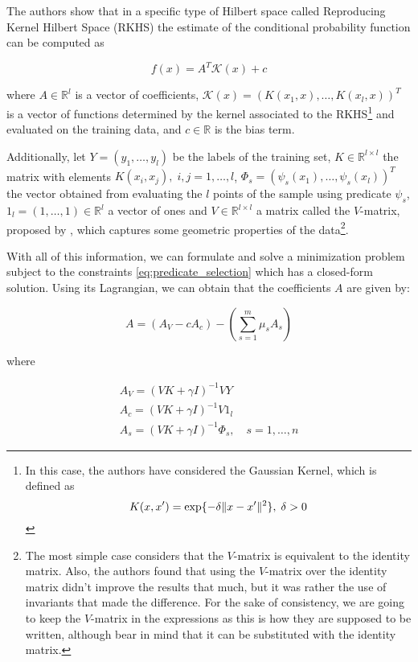 The authors show that in a specific type of Hilbert space called Reproducing Kernel Hilbert Space (RKHS)
the estimate of the conditional probability function can be computed as

\[
    f(x) = A^T \mathcal{K}(x) + c
\]

where $A \in \mathbb{R}^l$ is a vector of coefficients, $\mathcal{K}(x) = (K(x_1, x), \dots, K(x_l, x))^T$
is a vector of functions determined by the kernel associated to the RKHS\footnote{In this case, the authors have
considered the Gaussian Kernel, which is defined as
\[
    K(x, x') = \exp \lbrace -\delta \lVert x - x' \rVert^2 \rbrace,\; \delta > 0
\]
}
and evaluated on the training data, and $c \in \mathbb{R}$ is the bias term.

Additionally, let $Y = (y_1, \dots, y_l)$  be the labels of the training set,  $K \in \mathbb{R}^{l \times l}$
the matrix with elements $K(x_i, x_j),\; i, j = 1, \dots, l$, $\Phi_s = (\psi_s(x_1), \dots, \psi_s(x_l))^T$
the vector obtained from evaluating the $l$ points of the sample using predicate $\psi_s$,
$1_l = (1, \dots, 1) \in \mathbb{R}^l$ a vector of ones and $V \in \mathbb{R}^{l \times l}$ a matrix called
the $V$-matrix, proposed by \cite{Vapnik2015}, which captures some geometric properties of the data\footnote{The
most simple case considers that the $V$-matrix is equivalent to the identity matrix. Also, the authors found
that using the $V$-matrix over the identity matrix didn't improve the results that much, but it was rather the
use of invariants that made the difference. For the sake of consistency, we are going to keep the $V$-matrix in
the expressions as this is how they are supposed to be written, although bear in mind that it can be substituted with
the identity matrix.}.

With all of this information, we can formulate and solve a minimization problem subject to the constraints
\eqref{eq:predicate_selection} which has a closed-form solution. Using its Lagrangian, we can obtain that the
coefficients $A$ are given by:

\[
    A = (A_V - cA_c) - \left( \sum_{s=1}^m \mu_s A_s \right)
\]

where

\begin{equation*}
    \begin{gathered}
        A_V = (VK + \gamma I)^{-1} VY \\
        A_c = (VK + \gamma I)^{-1} V1_l \\
        A_s = (VK + \gamma I)^{-1} \Phi_s,\quad s = 1, \dots, n 
    \end{gathered}
\end{equation*}

